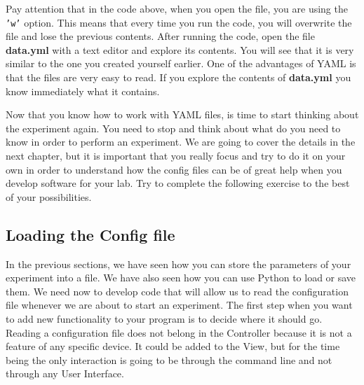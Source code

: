 Pay attention that in the code above, when you open the file, you are using the \texttt{'w'} option. This means that every time you run the code, you will overwrite the file and lose the previous contents. After running the code, open the file \textbf{data.yml} with a text editor and explore its contents. You will see that it is very similar to the one you created yourself earlier. One of the advantages of YAML is that the files are very easy to read. If you explore the contents of \textbf{data.yml} you know immediately what it contains.





Now that you know how to work with YAML files, is time to start thinking about the experiment again. You need to stop and think about what do you need to know in order to perform an experiment. We are going to cover the details in the next chapter, but it is important that you really focus and try to do it on your own in order to understand how the config files can be of great help when you develop software for your lab. Try to complete the following exercise to the best of your possibilities.


\subsection{Loading the Config file}\label{subsection:loading-the-config}
In the previous sections, we have seen how you can store the parameters of your experiment into a file. We have also seen how you can use Python to load or save them. We need now to develop code that will allow us to read the configuration file whenever we are about to start an experiment. The first step when you want to add new functionality to your program is to decide where it should go. Reading a configuration file does not belong in the Controller because it is not a feature of any specific device. It could be added to the View, but for the time being the only interaction is going to be through the command line and not through any User Interface. 

